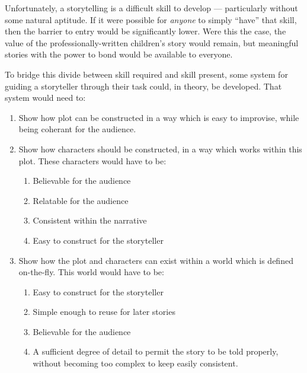 \documentclass{tufte-handout}
\begin{document}
Unfortunately, a storytelling is a difficult skill to develop --- particularly without some natural aptitude. If it were possible for \emph{anyone} to simply ``have'' that skill, then the barrier to entry would be significantly lower. Were this the case, the value of the professionally-written children's story would remain, but meaningful stories with the power to bond would be available to everyone.\par

To bridge this divide between skill required and skill present, some system for guiding a storyteller through their task could, in theory, be developed. That system would need to:

\begin{enumerate}
    \item Show how plot can be constructed in a way which is easy to improvise, while being coherant for the audience.
    \item Show how characters should be constructed, in a way which works within this plot. These characters would have to be:
        \begin{enumerate}
            \item Believable for the audience
            \item Relatable for the audience
            \item Consistent within the narrative
            \item Easy to construct for the storyteller
        \end{enumerate}
    \item Show how the plot and characters can exist within a world which is defined on-the-fly. This world would have to be:
        \begin{enumerate}
            \item Easy to construct for the storyteller
            \item Simple enough to reuse for later stories
            \item Believable for the audience
            \item A sufficient degree of detail to permit the story to be told properly, without becoming too complex to keep easily consistent.
        \end{enumerate}
\end{enumerate}
\end{document}
